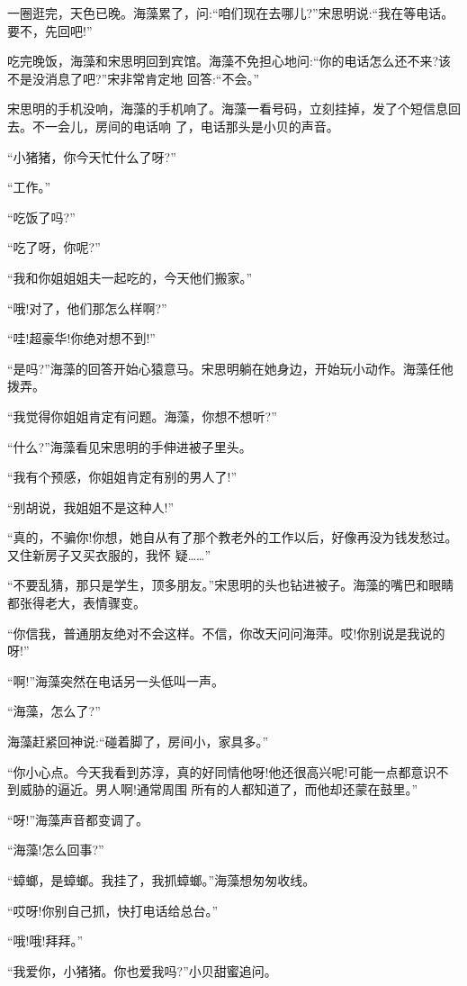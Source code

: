 \documentclass[11pt,a4paper,onecolumn]{article}
\begin{document}
一圈逛完，天色已晚。海藻累了，问:``咱们现在去哪儿?''宋思明说:``我在等电话。要不，先回吧!''

吃完晚饭，海藻和宋思明回到宾馆。海藻不免担心地问:``你的电话怎么还不来?该不是没消息了吧?''宋非常肯定地
回答:``不会。''

宋思明的手机没响，海藻的手机响了。海藻一看号码，立刻挂掉，发了个短信息回去。不一会儿，房间的电话响
了，电话那头是小贝的声音。

``小猪猪，你今天忙什么了呀?''

``工作。''

``吃饭了吗?''

``吃了呀，你呢?''

``我和你姐姐姐夫一起吃的，今天他们搬家。''

``哦!对了，他们那怎么样啊?''

``哇!超豪华!你绝对想不到!''

``是吗?''海藻的回答开始心猿意马。宋思明躺在她身边，开始玩小动作。海藻任他拨弄。

``我觉得你姐姐肯定有问题。海藻，你想不想听?''

``什么?''海藻看见宋思明的手伸进被子里头。

``我有个预感，你姐姐肯定有别的男人了!''

``别胡说，我姐姐不是这种人!''

``真的，不骗你!你想，她自从有了那个教老外的工作以后，好像再没为钱发愁过。又住新房子又买衣服的，我怀
疑……''

``不要乱猜，那只是学生，顶多朋友。''宋思明的头也钻进被子。海藻的嘴巴和眼睛都张得老大，表情骤变。

``你信我，普通朋友绝对不会这样。不信，你改天问问海萍。哎!你别说是我说的呀!''

``啊!''海藻突然在电话另一头低叫一声。

``海藻，怎么了?''

海藻赶紧回神说:``碰着脚了，房间小，家具多。''

``你小心点。今天我看到苏淳，真的好同情他呀!他还很高兴呢!可能一点都意识不到威胁的逼近。男人啊!通常周围
所有的人都知道了，而他却还蒙在鼓里。''

``呀!''海藻声音都变调了。

``海藻!怎么回事?''

``蟑螂，是蟑螂。我挂了，我抓蟑螂。''海藻想匆匆收线。

``哎呀!你别自己抓，快打电话给总台。''

``哦!哦!拜拜。''

``我爱你，小猪猪。你也爱我吗?''小贝甜蜜追问。
\end{document}
